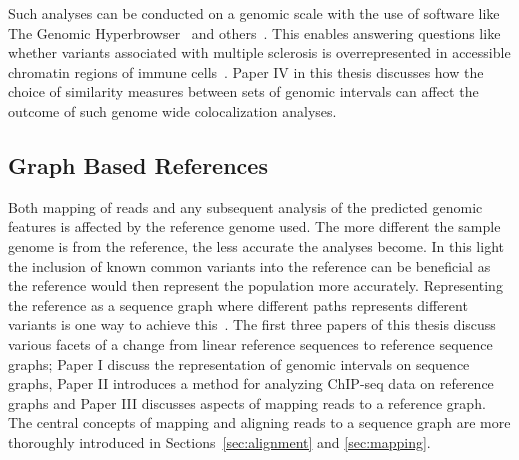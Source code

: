 Such analyses can be conducted on a genomic scale with the use of software like The Genomic Hyperbrowser~\cite{hyperbrowser} and others~\cite{colocstats, bedtools}.
This enables answering questions like whether variants associated with multiple sclerosis is overrepresented in  accessible chromatin regions of immune cells~\cite{hbexample}.
Paper IV in this thesis discusses how the choice of similarity measures between sets of genomic intervals can affect the outcome of such genome wide colocalization analyses.

\subsection{Graph Based References}
Both mapping of reads and any subsequent analysis of the predicted genomic features is affected by the reference genome used.
The more different the sample genome is from the reference, the less accurate the analyses become.
In this light the inclusion of known common variants into the reference can be beneficial as the reference would then represent the population more accurately.
Representing the reference as a sequence graph where different paths represents different variants is one way to achieve this~\cite{genomegraphs}.
The first three papers of this thesis discuss various facets of a change from linear reference sequences to reference sequence graphs; Paper I discuss the representation of genomic intervals on sequence graphs, Paper II introduces a method for analyzing ChIP-seq data on reference graphs and Paper III discusses aspects of mapping reads to a reference graph.
The central concepts of mapping and aligning reads to a sequence graph are more thoroughly introduced in Sections~\ref{sec:alignment} and \ref{sec:mapping}.


